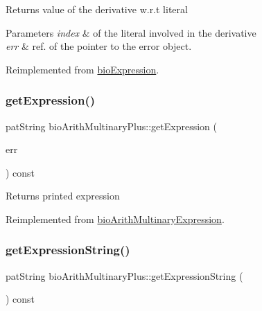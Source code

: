 \begin{DoxyReturn}{Returns}
value of the derivative w.\+r.\+t literal 
\end{DoxyReturn}

\begin{DoxyParams}{Parameters}
{\em index} & of the literal involved in the derivative \\
\hline
{\em err} & ref. of the pointer to the error object. \\
\hline
\end{DoxyParams}


Reimplemented from \hyperlink{classbio_expression_a5915579d1193f25f216c1e273c97f2ce}{bio\+Expression}.

\mbox{\label{classbio_arith_multinary_plus_a11b1c8e85618101f78dee811b2bf2630}} 
\subsubsection{\texorpdfstring{get\+Expression()}{getExpression()}}
{\footnotesize\ttfamily pat\+String bio\+Arith\+Multinary\+Plus\+::get\+Expression (\begin{DoxyParamCaption}\item[{pat\+Error $\ast$\&}]{err }\end{DoxyParamCaption}) const\hspace{0.3cm}{\ttfamily [virtual]}}

\begin{DoxyReturn}{Returns}
printed expression 
\end{DoxyReturn}


Reimplemented from \hyperlink{classbio_arith_multinary_expression_a769ab218dc1f1efcdaf3204da0ecc705}{bio\+Arith\+Multinary\+Expression}.

\mbox{\label{classbio_arith_multinary_plus_a65405ca19730cf4d30c05318f3ab29b0}} 
\subsubsection{\texorpdfstring{get\+Expression\+String()}{getExpressionString()}}
{\footnotesize\ttfamily pat\+String bio\+Arith\+Multinary\+Plus\+::get\+Expression\+String (\begin{DoxyParamCaption}{ }\end{DoxyParamCaption}) const\hspace{0.3cm}{\ttfamily [virtual]}}

